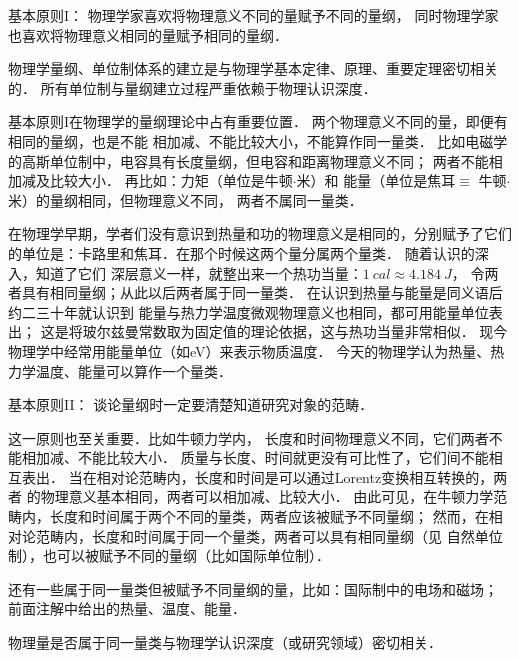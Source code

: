 {\heiti 基本原则I：} \label{chunit-dim:principle1}
{\kaishu 物理学家喜欢将物理意义不同的量赋予不同的量纲，
    同时物理学家也喜欢将物理意义相同的量赋予相同的量纲．}

\begin{remark}
    物理学量纲、单位制体系的建立是与物理学基本定律、原理、重要定理密切相关的．
    所有单位制与量纲建立过程严重依赖于物理认识深度．
\end{remark}

\begin{remark}
基本原则I在物理学的量纲理论中占有重要位置．
两个物理意义不同的量，即便有相同的量纲，也是不能
相加减、不能比较大小，不能算作同一量类．
比如电磁学的高斯单位制中，电容具有长度量纲，但电容和距离物理意义不同；
两者不能相加减及比较大小．
再比如：力矩（单位是{\kaishu 牛顿$\cdot$米}）和
能量（单位是{\kaishu 焦耳$\equiv$ 牛顿$\cdot$米}）的量纲相同，但物理意义不同，
两者不属同一量类．
\end{remark}


\begin{remark}
    在物理学早期，学者们没有意识到热量和功的物理意义是相同的，分别赋予了它们
    的单位是：{\kaishu 卡路里}和{\kaishu 焦耳}．在那个时候这两个量分属两个量类．
    随着认识的深入，知道了它们
    深层意义一样，就整出来一个热功当量：$\SI{1}{cal} \approx \SI{4.184}{J}$，
    令两者具有相同量纲；从此以后两者属于同一量类．
    在认识到热量与能量是同义语后约二三十年就认识到
    能量与热力学温度微观物理意义也相同，都可用能量单位表出；
    这是将玻尔兹曼常数取为固定值的理论依据，这与热功当量非常相似．
    现今物理学中经常用能量单位（如\si{eV}）来表示物质温度．
    今天的物理学认为热量、热力学温度、能量可以算作一个量类．
\end{remark}


{\heiti 基本原则II：} \label{chunit-dim:principle2}
{\kaishu 谈论量纲时一定要清楚知道研究对象的范畴．}

\begin{remark}
    这一原则也至关重要．比如牛顿力学内，
    长度和时间物理意义不同，它们两者{\kaishu 不能}相加减、{\kaishu 不能}比较大小．
    质量与长度、时间就更没有可比性了，它们间不能相互表出．
    当在相对论范畴内，长度和时间是可以通过Lorentz变换相互转换的，两者
    的物理意义基本相同，两者可以相加减、比较大小．
    由此可见，在牛顿力学范畴内，长度和时间属于两个不同的量类，两者应该被赋予不同量纲；
    然而，在相对论范畴内，长度和时间属于同一个量类，两者可以具有相同量纲（见
    自然单位制），也可以被赋予不同的量纲（比如国际单位制）．

    还有一些属于同一量类但被赋予不同量纲的量，比如：国际制中的电场和磁场；
    前面注解中给出的热量、温度、能量．

    物理量是否属于同一量类与物理学认识深度（或研究领域）密切相关．
\end{remark}

